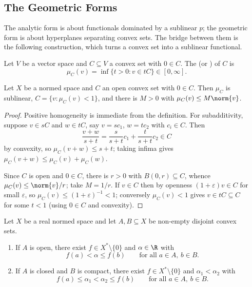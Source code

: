 \subsection{The Geometric Forms}

The analytic form is about functionals dominated by a sublinear $p$; the geometric form is about hyperplanes separating convex sets. The bridge between them is the following construction, which turns a convex set into a sublinear functional.

\begin{definition}
	Let $V$ be a vector space and $C \subseteq V$ a convex set with $0 \in C$. The  (or ) of $C$ is
	$$\mu_C(v) = \inf \{ t > 0 : v \in tC \} \in [0, \infty].$$
\end{definition}

\begin{lemma}
	Let $X$ be a normed space and $C$ an open convex set with $0 \in C$. Then $\mu_C$ is sublinear, $C = \{v : \mu_C(v) < 1\}$, and there is $M > 0$ with $\mu_C(v) \leq M \norm{v}$.
\end{lemma}

\begin{proof}
	Positive homogeneity is immediate from the definition. For subadditivity, suppose $v \in sC$ and $w \in tC$, say $v = sc_1$, $w = tc_2$ with $c_i \in C$. Then
	$$\frac{v+w}{s+t} = \frac{s}{s+t}c_1 + \frac{t}{s+t}c_2 \in C$$
	by convexity, so $\mu_C(v+w) \leq s + t$; taking infima gives $\mu_C(v+w) \leq \mu_C(v) + \mu_C(w)$.

	Since $C$ is open and $0 \in C$, there is $r > 0$ with $B(0,r) \subseteq C$, whence $\mu_C(v) \leq \norm{v}/r$; take $M = 1/r$. If $v \in C$ then by openness $(1+\varepsilon)v \in C$ for small $\varepsilon$, so $\mu_C(v) \leq (1+\varepsilon)^{-1} < 1$; conversely $\mu_C(v) < 1$ gives $v \in tC \subseteq C$ for some $t < 1$ (using $0 \in C$ and convexity).
\end{proof}

\begin{theorem}
	Let $X$ be a real normed space and let $A, B \subseteq X$ be non-empty disjoint convex sets.
	\begin{enumerate}[label=(\roman*)]
		\item If $A$ is open, there exist $f \in X^* \setminus \{0\}$ and $\alpha \in \R$ with
		$$f(a) < \alpha \leq f(b) \qquad \text{for all } a \in A, \ b \in B.$$
		\item If $A$ is closed and $B$ is compact, there exist $f \in X^*\setminus\{0\}$ and $\alpha_1 < \alpha_2$ with
		$$f(a) \leq \alpha_1 < \alpha_2 \leq f(b) \qquad \text{for all } a \in A, \ b \in B.$$
	\end{enumerate}
\end{theorem}

